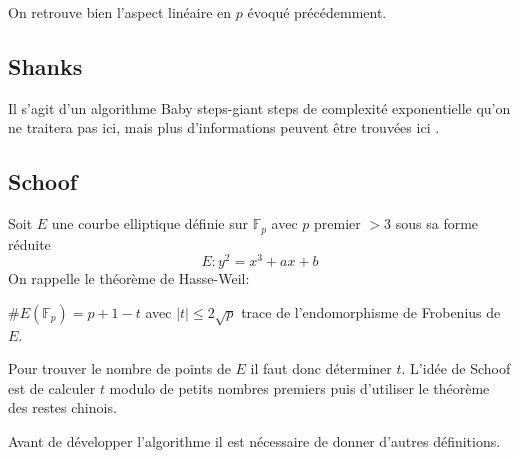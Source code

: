 \documentclass[12pt]{article}
\begin{document}
On retrouve bien l'aspect linéaire en $p$ évoqué précédemment.
\subsection{Shanks}
Il s'agit d'un algorithme Baby steps-giant steps de complexité exponentielle qu'on ne traitera pas ici, mais plus d'informations peuvent être trouvées ici \cite{artSchoof}.

\subsection{Schoof}
Soit $E$ une courbe elliptique définie sur $\mathbb{F}_p$ avec $p$ premier $>3$ sous sa forme réduite 
$$ E: y^2 = x^3 + ax+b$$
On rappelle le théorème de Hasse-Weil:

\begin{thm}
$\#E(\mathbb{F}_p) = p + 1 - t$ avec $|t| \leq 2 \sqrt{p}$ trace de l'endomorphisme de Frobenius de $E$.
\end{thm}
Pour trouver le nombre de points de $E$ il faut donc déterminer $t$. 
L'idée de Schoof est de calculer $t$ modulo de petits nombres premiers puis d'utiliser le théorème des restes chinois. 

Avant de développer l'algorithme il est nécessaire de donner d'autres définitions. 
\end{document}
